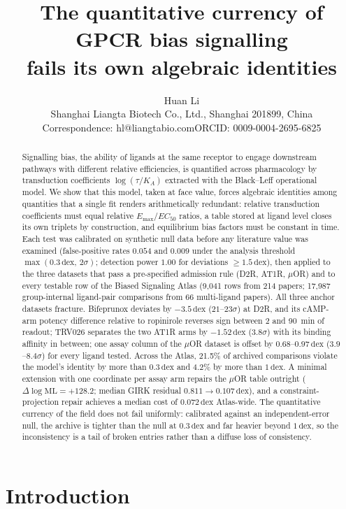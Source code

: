 ﻿\documentclass[11pt,a4paper]{article}
\title{\textbf{The quantitative currency of GPCR bias signalling\\ fails its own algebraic identities}}
\author{Huan Li\\[2pt]
\small Shanghai Liangta Biotech Co., Ltd., Shanghai 201899, China\\
\small Correspondence: hl@liangtabio.com\quad ORCID: 0009-0004-2695-6825}
\date{}
\newcommand{\dex}{\ensuremath{\,\mathrm{dex}}}
\newcommand{\logR}{\ensuremath{\log(\tau/K_{\!A})}}
\newcommand{\Emax}{\ensuremath{E_{\max}}}
\newcommand{\ECfifty}{\ensuremath{EC_{50}}}
\begin{document}
\maketitle

\begin{abstract}
\noindent
Signalling bias, the ability of ligands at the same receptor to engage downstream pathways with different relative efficiencies, is quantified across pharmacology by transduction coefficients $\logR$ extracted with the Black--Leff operational model. We show that this model, taken at face value, forces algebraic identities among quantities that a single fit renders arithmetically redundant: relative transduction coefficients must equal relative $\Emax/\ECfifty$ ratios, a table stored at ligand level closes its own triplets by construction, and equilibrium bias factors must be constant in time. Each test was calibrated on synthetic null data before any literature value was examined (false-positive rates $0.054$ and $0.009$ under the analysis threshold $\max(0.3\dex,\,2\sigma)$; detection power $1.00$ for deviations $\geq 1.5\dex$), then applied to the three datasets that pass a pre-specified admission rule (D2R, AT1R, $\mu$OR) and to every testable row of the Biased Signaling Atlas (9{,}041 rows from 214 papers; 17{,}987 group-internal ligand-pair comparisons from 66 multi-ligand papers). All three anchor datasets fracture. Bifeprunox deviates by $-3.5\dex$ ($21$--$23\sigma$) at D2R, and its cAMP-arm potency difference relative to ropinirole reverses sign between 2 and 90~min of readout; TRV026 separates the two AT1R arms by $-1.52\dex$ ($3.8\sigma$) with its binding affinity in between; one assay column of the $\mu$OR dataset is offset by $0.68$--$0.97\dex$ ($3.9$--$8.4\sigma$) for every ligand tested. Across the Atlas, 21.5\% of archived comparisons violate the model's identity by more than $0.3\dex$ and 4.2\% by more than $1\dex$. A minimal extension with one coordinate per assay arm repairs the $\mu$OR table outright ($\Delta\log\mathrm{ML}=+128.2$; median GIRK residual $0.811\to0.107\dex$), and a constraint-projection repair achieves a median cost of $0.072\dex$ Atlas-wide. The quantitative currency of the field does not fail uniformly: calibrated against an independent-error null, the archive is tighter than the null at $0.3\dex$ and far heavier beyond $1\dex$, so the inconsistency is a tail of broken entries rather than a diffuse loss of consistency.
\end{abstract}

\section{Introduction}
\end{document}
